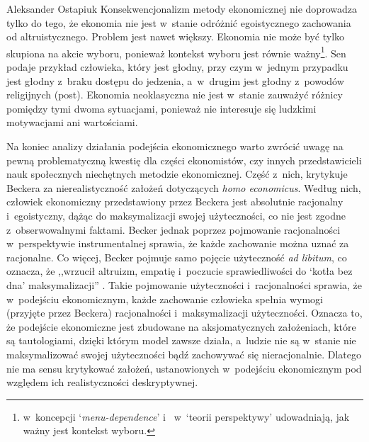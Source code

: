 \begin{artplenv}{Aleksander Ostapiuk}
Konsekwencjonalizm metody ekonomicznej nie doprowadza tylko do tego, że ekonomia nie jest w~stanie odróżnić
egoistycznego zachowania od altruistycznego. Problem jest nawet większy. Ekonomia nie może być tylko skupiona na akcie
wyboru, ponieważ kontekst wyboru jest równie ważny\footnote{%
\parencite[s.~130]{sen_rationality_2002}
w~koncepcji
`\textit{menu-dependence}' i~\parencite{kahneman_prospect_1979}
w~`teorii perspektywy' udowadniają, jak
ważny jest kontekst wyboru.}. Sen
\parencite*[s.~75]{sen_development_1999}
podaje przykład człowieka, który jest głodny,
przy czym w~jednym przypadku jest głodny z~braku dostępu do jedzenia, a~w~drugim jest głodny z~powodów religijnych
(post). Ekonomia neoklasyczna nie jest w~stanie zauważyć różnicy pomiędzy tymi dwoma sytuacjami, ponieważ nie
interesuje się ludzkimi motywacjami ani wartościami.

Na koniec analizy działania podejścia ekonomicznego warto zwrócić uwagę na pewną problematyczną kwestię dla części
ekonomistów, czy innych przedstawicieli nauk społecznych niechętnych metodzie ekonomicznej. Część z~nich,
krytykuje Beckera za nierealistyczność założeń dotyczących \textit{homo economicus}. Według nich, człowiek ekonomiczny
przedstawiony przez Beckera jest absolutnie racjonalny i~egoistyczny, dążąc do maksymalizacji swojej użyteczności, co
nie jest zgodne z~obserwowalnymi faktami. Becker jednak poprzez pojmowanie racjonalności w~perspektywie instrumentalnej
sprawia, że każde zachowanie można uznać za racjonalne. Co więcej, Becker pojmuje samo pojęcie użyteczność \textit{ad
libitum}, co oznacza, że ,,wrzucił altruizm, empatię i~poczucie sprawiedliwości do `kotła bez dna' maksymalizacji''
\parencite[s.~74–75]{ostapiuk_moralna_2017}.
Takie pojmowanie użyteczności i~racjonalności sprawia,
że w~podejściu ekonomicznym, każde zachowanie człowieka spełnia wymogi (przyjęte przez Beckera)
racjonalności i~maksymalizacji użyteczności. Oznacza to, że podejście ekonomiczne jest zbudowane na aksjomatycznych założeniach, które
są tautologiami, dzięki którym model zawsze działa, a~ludzie nie są w~stanie nie maksymalizować swojej użyteczności
bądź zachowywać się nieracjonalnie. Dlatego nie ma sensu krytykować założeń, ustanowionych w~podejściu
ekonomicznym pod względem ich realistyczności deskryptywnej. 


\end{artplenv}
